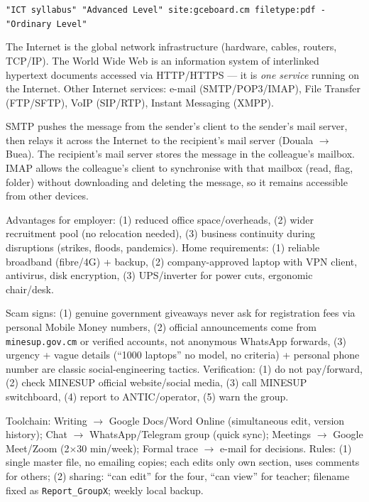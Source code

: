 \documentclass[11pt]{article}
\begin{document}
\begin{corrige}[Exercise 1]
\texttt{"ICT syllabus" "Advanced Level" site:gceboard.cm filetype:pdf -"Ordinary Level"}
\end{corrige}

\begin{corrige}[Exercise 2]
The Internet is the global network infrastructure (hardware, cables, routers, TCP/IP). The World Wide Web is an information system of interlinked hypertext documents accessed via HTTP/HTTPS --- it is \emph{one service} running on the Internet. Other Internet services: e-mail (SMTP/POP3/IMAP), File Transfer (FTP/SFTP), VoIP (SIP/RTP), Instant Messaging (XMPP).
\end{corrige}

\begin{corrige}[Exercise 3]
SMTP pushes the message from the sender's client to the sender's mail server, then relays it across the Internet to the recipient's mail server (Douala $\rightarrow$ Buea). The recipient's mail server stores the message in the colleague's mailbox. IMAP allows the colleague's client to synchronise with that mailbox (read, flag, folder) without downloading and deleting the message, so it remains accessible from other devices.
\end{corrige}

\begin{corrige}[Exercise 4]
Advantages for employer: (1) reduced office space/overheads, (2) wider recruitment pool (no relocation needed), (3) business continuity during disruptions (strikes, floods, pandemics). Home requirements: (1) reliable broadband (fibre/4G) + backup, (2) company-approved laptop with VPN client, antivirus, disk encryption, (3) UPS/inverter for power cuts, ergonomic chair/desk.
\end{corrige}

\begin{corrige}[Exercise 5]
Scam signs: (1) genuine government giveaways never ask for registration fees via personal Mobile Money numbers, (2) official announcements come from \texttt{minesup.gov.cm} or verified accounts, not anonymous WhatsApp forwards, (3) urgency + vague details (``1000 laptops'' no model, no criteria) + personal phone number are classic social-engineering tactics. Verification: (1) do not pay/forward, (2) check MINESUP official website/social media, (3) call MINESUP switchboard, (4) report to ANTIC/operator, (5) warn the group.
\end{corrige}

\begin{corrige}[Exercise 6]
Toolchain: Writing $\rightarrow$ Google Docs/Word Online (simultaneous edit, version history); Chat $\rightarrow$ WhatsApp/Telegram group (quick sync); Meetings $\rightarrow$ Google Meet/Zoom (2$\times$30 min/week); Formal trace $\rightarrow$ e-mail for decisions. Rules: (1) single master file, no emailing copies; each edits only own section, uses comments for others; (2) sharing: ``can edit'' for the four, ``can view'' for teacher; filename fixed as \texttt{Report\_GroupX}; weekly local backup.
\end{corrige}
\end{document}
